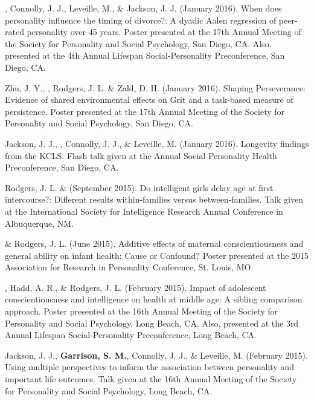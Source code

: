\item \meb, Connolly, J. J., Leveille, M., \& Jackson, J. J. (January 2016). When does personality influence the timing of divorce?: A dyadic Aalen regression of peer-rated personality over 45 years. Poster presented at the 17th Annual Meeting of the Society for Personality and Social Psychology, San Diego, CA. Also, presented at the 4th Annual Lifespan Social-Personality  Preconference, San Diego, CA.
\item Zhu, J. Y., \meb, Rodgers, J. L. \& Zald, D. H. (January 2016). Shaping Perseverance: Evidence of shared environmental effects on Grit and a task-based measure of persistence. Poster presented at the 17th Annual Meeting of the Society for Personality and Social Psychology, San Diego, CA.
\item Jackson, J. J., \meb, Connolly, J. J., \& Leveille, M. (January 2016). Longevity findings from the KCLS. Flash talk given at the Annual Social Personality Health Preconference, San Diego, CA. %
\item Rodgers, J. L. \& \meb (September 2015). Do intelligent girls delay age at first intercourse?:  Different results within-families versus between-families. Talk given at the International Society for Intelligence Research Annual Conference in Albuquerque, NM.
\item \meb \& Rodgers, J. L. (June 2015). Additive effects of maternal conscientiousness and general ability on infant health: Cause or Confound? Poster presented at the 2015 Association for Research in Personality Conference, St. Louis, MO.%
\item \meb, Hadd, A. R., \& Rodgers, J. L. (February 2015). Impact of adolescent conscientiousness and intelligence on health at middle age: A sibling comparison approach. Poster presented at the 16th Annual Meeting of the Society for Personality and  Social Psychology, Long Beach, CA. Also, presented at the 3rd Annual Lifespan Social-Personality Preconference, Long Beach, CA.
\item Jackson, J. J., \textbf{Garrison, S. M.}, Connolly, J. J., \& Leveille, M. (February 2015). Using multiple perspectives to inform the association between personality and important life outcomes. Talk given at the 16th Annual Meeting of the Society for Personality and  Social Psychology, Long Beach, CA.
